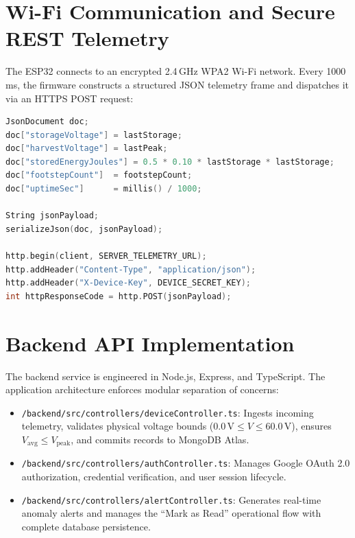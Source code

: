 \section{Wi-Fi Communication and Secure REST Telemetry}
The ESP32 connects to an encrypted 2.4\,GHz WPA2 Wi-Fi network. Every 1000\,ms, the firmware constructs a structured JSON telemetry frame and dispatches it via an HTTPS POST request:
\begin{lstlisting}[language=C++, caption={JSON telemetry serialization in ESP32 firmware.}, label={lst:firmware_json}]
JsonDocument doc;
doc["storageVoltage"] = lastStorage;
doc["harvestVoltage"] = lastPeak;
doc["storedEnergyJoules"] = 0.5 * 0.10 * lastStorage * lastStorage;
doc["footstepCount"]  = footstepCount;
doc["uptimeSec"]      = millis() / 1000;

String jsonPayload;
serializeJson(doc, jsonPayload);

http.begin(client, SERVER_TELEMETRY_URL);
http.addHeader("Content-Type", "application/json");
http.addHeader("X-Device-Key", DEVICE_SECRET_KEY);
int httpResponseCode = http.POST(jsonPayload);
\end{lstlisting}

\section{Backend API Implementation}
The backend service is engineered in Node.js, Express, and TypeScript. The application architecture enforces modular separation of concerns:
\begin{itemize}
    \item \texttt{/backend/src/controllers/deviceController.ts}: Ingests incoming telemetry, validates physical voltage bounds ($0.0\,\text{V} \le V \le 60.0\,\text{V}$), ensures $V_{\text{avg}} \le V_{\text{peak}}$, and commits records to MongoDB Atlas.
    \item \texttt{/backend/src/controllers/authController.ts}: Manages Google OAuth 2.0 authorization, credential verification, and user session lifecycle.
    \item \texttt{/backend/src/controllers/alertController.ts}: Generates real-time anomaly alerts and manages the ``Mark as Read'' operational flow with complete database persistence.
\end{itemize}

